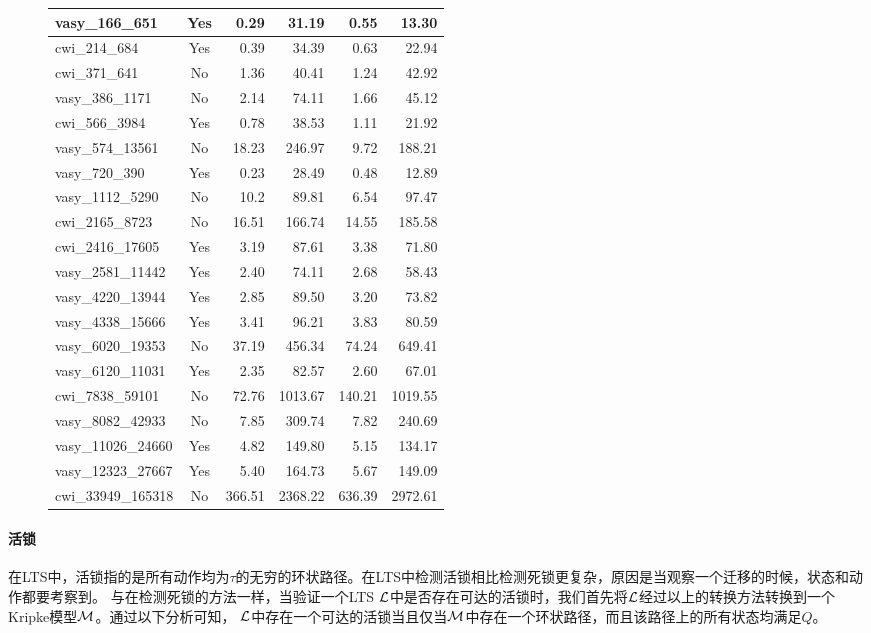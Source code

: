 \begin{figure}[h!]
\begin{tabular}{| l | c | r | r | r | r |}
		vasy\_166\_651 & Yes &	0.29 &	31.19 &	0.55 &	13.30\\\hline
		cwi\_214\_684 &	Yes &	0.39 &	34.39 &	0.63 &	22.94\\\hline
		cwi\_371\_641 &	No &	1.36 &	40.41 &	1.24 &	42.92\\\hline
		vasy\_386\_1171 & No &	2.14 &	74.11 &	1.66 &	45.12\\\hline
		cwi\_566\_3984 & Yes &	0.78 &	38.53 &	1.11 &	21.92\\\hline
		vasy\_574\_13561 &	No & 18.23 &	246.97 &	9.72 &	188.21\\\hline
		vasy\_720\_390 	& Yes &	0.23 &	28.49 &	0.48 &	12.89\\\hline
		vasy\_1112\_5290 & No &	10.2 &	89.81 &	6.54 & 97.47\\\hline
		cwi\_2165\_8723 &	No &16.51 &	166.74 &14.55 &	185.58 \\\hline
		cwi\_2416\_17605 &	Yes &3.19 &	87.61 &	3.38 &	71.80 \\\hline
		vasy\_2581\_11442 &	Yes &2.40 &	74.11 &	2.68 &	58.43 \\\hline
		vasy\_4220\_13944 &	Yes &2.85 &	89.50 &	3.20 &	73.82 \\\hline
		vasy\_4338\_15666 &	Yes &3.41 &	96.21 &	3.83 &	80.59 \\\hline
		vasy\_6020\_19353 &	No &37.19 &	456.34 &	74.24 &	649.41 \\\hline
		vasy\_6120\_11031 &	Yes &2.35 &	82.57 	&2.60 &	67.01 \\\hline
		cwi\_7838\_59101 &	No &72.76 &	1013.67 &	140.21 &1019.55\\\hline
		vasy\_8082\_42933 &	No & 7.85 &	309.74 	&7.82 &	240.69 	\\\hline
		vasy\_11026\_24660 & Yes & 4.82 &149.80 &5.15 &	134.17 \\\hline
		vasy\_12323\_27667 	&Yes &5.40 &	164.73 & 5.67 &	149.09 \\\hline
		cwi\_33949\_165318 	&	No &	366.51 &	2368.22 &	636.39 &2972.61 
		\\\hline
		
		\hline
		
	\end{tabular}
	\label{benchmark:vlts:deadlock}
\end{figure}

\paragraph{活锁}
在\textsf{LTS}中，活锁指的是所有动作均为$\tau$的无穷的环状路径。在\textsf{LTS}中检测活锁相比检测死锁更复杂，原因是当观察一个迁移的时候，状态和动作都要考察到。
与在检测死锁的方法一样，当验证一个\textsf{LTS} $\cal L$中是否存在可达的活锁时，我们首先将$\cal L$经过以上的转换方法转换到一个Kripke模型$\cal M$。通过以下分析可知，
$\cal L$中存在一个可达的活锁当且仅当$\cal M$中存在一个环状路径，而且该路径上的所有状态均满足$Q$。

